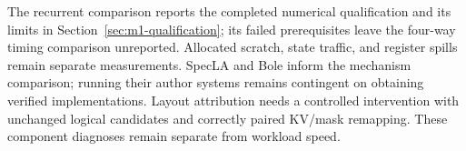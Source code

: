 \documentclass[conference]{IEEEtran}
\begin{document}
The recurrent comparison reports the completed numerical qualification and its limits in Section~\ref{sec:m1-qualification}; its failed prerequisites leave the four-way timing comparison unreported. Allocated scratch, state traffic, and register spills remain separate measurements. SpecLA and Bole inform the mechanism comparison; running their author systems remains contingent on obtaining verified implementations. Layout attribution needs a controlled intervention with unchanged logical candidates and correctly paired KV/mask remapping. These component diagnoses remain separate from workload speed.



\label{ReferencesStart}
\balance


\end{document}
